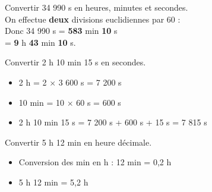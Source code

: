 \begin{Exemple}
\vspace{-1cm}
\begin{minipage}[c]{0.45\textwidth}
Convertir 34 990 s en heures, minutes et secondes. \\
On effectue \textbf{deux} divisions euclidiennes par 60 : \\
Donc 34 990 s = {\color{Couleur8}\textbf{583}} min {\color{Couleur7}\textbf{10}} s \\
\hspace*{2.5cm} = {\color{Couleur11}\textbf{9}} h {\color{Couleur12}\textbf{43}} min {\color{Couleur7}\textbf{10}} s.
\end{minipage} \hfill \begin{minipage}[c]{0.25\textwidth}
\begin{center}
\end{center}
\end{minipage} \hfill \begin{minipage}[c]{0.25\textwidth}
\begin{center}
\end{center}
\end{minipage}

\end{Exemple}

\begin{Exemple}
Convertir 2 h 10 min 15 s en secondes.
\begin{itemize}[label=\textcolor{Couleur8}{$\bullet$}]
\item 2 h = 2 $\times$ 3 600 s = 7 200 s
\item 10 min = 10 $\times$ 60 s = 600 s
\item 2 h 10 min 15 s = 7 200 s + 600 s + 15 s = 7 815 s
\end{itemize}
\end{Exemple}

\begin{Exemple}
\begin{minipage}[c]{0.7\textwidth}
Convertir 5 h 12 min en heure décimale.
\begin{itemize}[label=\textcolor{Couleur8}{$\bullet$}]
\item Conversion des min en h : 12 min = 0,2 h
\item 5 h 12 min = 5,2 h
\end{itemize}
\end{minipage} \hfill \begin{minipage}[c]{0.25\textwidth}
\begin{center}
\end{center}
\end{minipage}

\end{Exemple}

